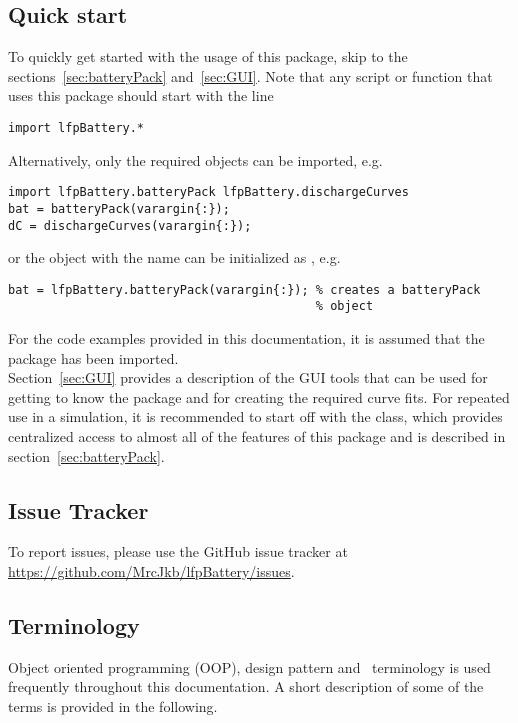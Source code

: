 \subsection*{Quick start}
To quickly get started with the usage of this package, skip to the sections~\ref{sec:batteryPack} and~\ref{sec:GUI}. Note that any script or function that uses this package should start with the line
\begin{lstlisting}
import lfpBattery.*
\end{lstlisting}
Alternatively, only the required objects can be imported, e.g.
\begin{lstlisting}
import lfpBattery.batteryPack lfpBattery.dischargeCurves
bat = batteryPack(varargin{:});
dC = dischargeCurves(varargin{:});
\end{lstlisting}
or the object with the name  can be initialized as , e.g.
\begin{lstlisting}
bat = lfpBattery.batteryPack(varargin{:}); % creates a batteryPack 
										   % object
\end{lstlisting}
For the code examples provided in this documentation, it is assumed that the  package has been imported. \\
Section~\ref{sec:GUI} provides a description of the GUI tools that can be used for getting to know the package and for creating the required curve fits. For repeated use in a simulation, it is recommended to start off with the  class, which provides centralized access to almost all of the features of this package and is described in section~\ref{sec:batteryPack}.

\subsection*{Issue Tracker}
To report issues, please use the GitHub issue tracker at \url{https://github.com/MrcJkb/lfpBattery/issues}.

\subsection*{Terminology}
Object oriented programming (OOP), design pattern and \matlab\ terminology is used frequently throughout this documentation. A short description of some of the terms is provided in the following.

